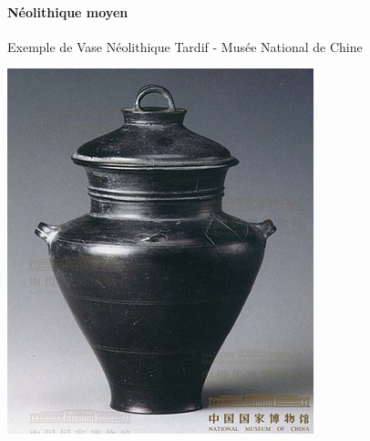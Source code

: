 \paragraph{Néolithique moyen}


 
\begin{marginfigure}
    \caption{Exemple de Vase Néolithique Tardif - Musée National de Chine}
    \includegraphics[width=\textwidth]{ConfucianismeTaoismeBouddhismeChinois/Images/NeolithiqueTardifNationalMuseum.jpg}

\end{marginfigure}
\FloatBarrier
